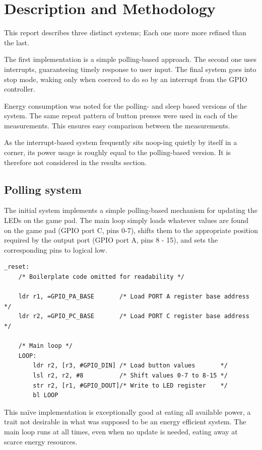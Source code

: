 \section{Description and Methodology}

This report describes three distinct systems; Each one more more refined than the last.

The first implementation is a simple polling-based approach. The second one uses interrupts, guaranteeing timely response to user input. The final system goes into stop mode, waking only when coerced to do so by an interrupt from the GPIO controller.

Energy consumption was noted for the polling- and sleep based versions of the system. The same repeat pattern of button presses were used in each of the measurements. This ensures easy comparison between the measurements.

As the interrupt-based system frequently sits noop-ing quietly by itself in a corner, its power usage is roughly equal to the polling-based version. It is therefore not considered in the results section. 

\subsection{Polling system}

The initial system implements a simple polling-based mechanism for updating the LEDs on the game pad. The main loop simply loads whatever values are found on the game pad (GPIO port C, pins 0-7), shifts them to the appropriate position required by the output port (GPIO port A, pins 8 - 15), and sets the corresponding pins to logical low.

\begin{lstlisting}[caption={Polling loop}, label={lst:polling-loop}]
_reset:
    /* Boilerplate code omitted for readability */

    ldr r1, =GPIO_PA_BASE       /* Load PORT A register base address    */
    ldr r2, =GPIO_PC_BASE       /* Load PORT C register base address    */

    /* Main loop */
    LOOP:
        ldr r2, [r3, #GPIO_DIN] /* Load button values       */
        lsl r2, r2, #8          /* Shift values 0-7 to 8-15 */
        str r2, [r1, #GPIO_DOUT]/* Write to LED register    */
        bl LOOP

\end{lstlisting}

This naïve implementation is exceptionally good at eating all available power, a trait not desirable in what was supposed to be an energy efficient system. The main loop runs at all times, even when no update is needed, eating away at scarce energy resources.


